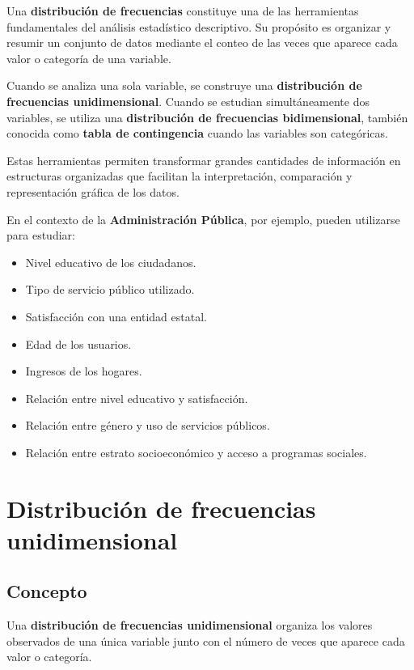 \documentclass[
  spanish,
  14pt,
  letterpaper,
  DIV=11,
  numbers=noendperiod]{scrartcl}
\providecommand{\tightlist}{%
  \setlength{\itemsep}{0pt}\setlength{\parskip}{0pt}}
\begin{document}
Una \textbf{distribución de frecuencias} constituye una de las
herramientas fundamentales del análisis estadístico descriptivo. Su
propósito es organizar y resumir un conjunto de datos mediante el conteo
de las veces que aparece cada valor o categoría de una variable.

Cuando se analiza una sola variable, se construye una
\textbf{distribución de frecuencias unidimensional}. Cuando se estudian
simultáneamente dos variables, se utiliza una \textbf{distribución de
frecuencias bidimensional}, también conocida como \textbf{tabla de
contingencia} cuando las variables son categóricas.

Estas herramientas permiten transformar grandes cantidades de
información en estructuras organizadas que facilitan la interpretación,
comparación y representación gráfica de los datos.

En el contexto de la \textbf{Administración Pública}, por ejemplo,
pueden utilizarse para estudiar:

\begin{itemize}
\tightlist
\item
  Nivel educativo de los ciudadanos.
\item
  Tipo de servicio público utilizado.
\item
  Satisfacción con una entidad estatal.
\item
  Edad de los usuarios.
\item
  Ingresos de los hogares.
\item
  Relación entre nivel educativo y satisfacción.
\item
  Relación entre género y uso de servicios públicos.
\item
  Relación entre estrato socioeconómico y acceso a programas sociales.
\end{itemize}

\section{Distribución de frecuencias
unidimensional}\label{distribuciuxf3n-de-frecuencias-unidimensional}

\subsection{Concepto}\label{concepto}

Una \textbf{distribución de frecuencias unidimensional} organiza los
valores observados de una única variable junto con el número de veces
que aparece cada valor o categoría.
\end{document}
